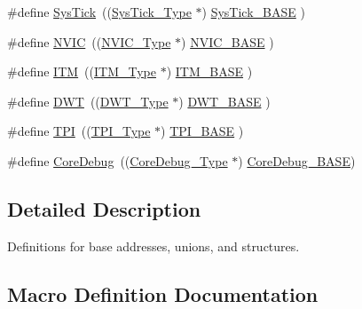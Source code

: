 \begin{DoxyCompactItemize}
\item 
\#define \mbox{\hyperlink{group___c_m_s_i_s__core__base_gacd96c53beeaff8f603fcda425eb295de}{Sys\+Tick}}~((\mbox{\hyperlink{struct_sys_tick___type}{Sys\+Tick\+\_\+\+Type}}   $\ast$)     \mbox{\hyperlink{group___c_m_s_i_s__core__base_ga58effaac0b93006b756d33209e814646}{Sys\+Tick\+\_\+\+B\+A\+SE}}  )
\item 
\#define \mbox{\hyperlink{group___c_m_s_i_s__core__base_gac8e97e8ce56ae9f57da1363a937f8a17}{N\+V\+IC}}~((\mbox{\hyperlink{struct_n_v_i_c___type}{N\+V\+I\+C\+\_\+\+Type}}      $\ast$)     \mbox{\hyperlink{group___c_m_s_i_s__core__base_gaa0288691785a5f868238e0468b39523d}{N\+V\+I\+C\+\_\+\+B\+A\+SE}}     )
\item 
\#define \mbox{\hyperlink{group___c_m_s_i_s__core__base_gabae7cdf882def602cb787bb039ff6a43}{I\+TM}}~((\mbox{\hyperlink{struct_i_t_m___type}{I\+T\+M\+\_\+\+Type}}       $\ast$)     \mbox{\hyperlink{group___c_m_s_i_s__core__base_gadd76251e412a195ec0a8f47227a8359e}{I\+T\+M\+\_\+\+B\+A\+SE}}      )
\item 
\#define \mbox{\hyperlink{group___c_m_s_i_s__core__base_gabbe5a060185e1d5afa3f85b14e10a6ce}{D\+WT}}~((\mbox{\hyperlink{struct_d_w_t___type}{D\+W\+T\+\_\+\+Type}}       $\ast$)     \mbox{\hyperlink{group___c_m_s_i_s__core__base_gafdab534f961bf8935eb456cb7700dcd2}{D\+W\+T\+\_\+\+B\+A\+SE}}      )
\item 
\#define \mbox{\hyperlink{group___c_m_s_i_s__core__base_ga8b4dd00016aed25a0ea54e9a9acd1239}{T\+PI}}~((\mbox{\hyperlink{struct_t_p_i___type}{T\+P\+I\+\_\+\+Type}}       $\ast$)     \mbox{\hyperlink{group___c_m_s_i_s__core__base_ga2b1eeff850a7e418844ca847145a1a68}{T\+P\+I\+\_\+\+B\+A\+SE}}      )
\item 
\#define \mbox{\hyperlink{group___c_m_s_i_s__core__base_gab6e30a2b802d9021619dbb0be7f5d63d}{Core\+Debug}}~((\mbox{\hyperlink{struct_core_debug___type}{Core\+Debug\+\_\+\+Type}} $\ast$)     \mbox{\hyperlink{group___c_m_s_i_s__core__base_ga680604dbcda9e9b31a1639fcffe5230b}{Core\+Debug\+\_\+\+B\+A\+SE}})
\end{DoxyCompactItemize}


\subsection{Detailed Description}
Definitions for base addresses, unions, and structures. 



\subsection{Macro Definition Documentation}
\mbox{\label{group___c_m_s_i_s__core__base_gab6e30a2b802d9021619dbb0be7f5d63d}} 
